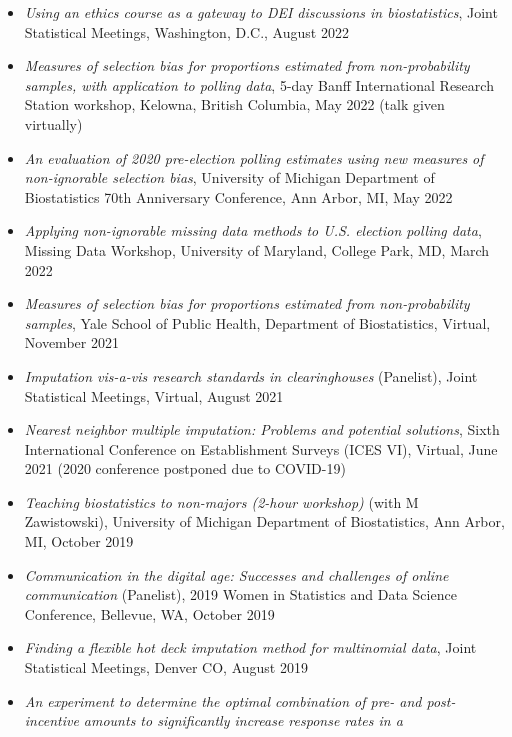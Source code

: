 \documentclass[
  english,
  letterpaper,
  DIV=11,
  numbers=noendperiod]{scrartcl}
\begin{document}
\begin{itemize}
{  non-probability samples and low response rate probability samples},
  Federal Committee on Statistical Methodology 2022 Research and Policy
  Conference, Washington, D.C., October 2022
\item
  \emph{Using an ethics course as a gateway to DEI discussions in
  biostatistics}, Joint Statistical Meetings, Washington, D.C., August
  2022
\item
  \emph{Measures of selection bias for proportions estimated from
  non-probability samples, with application to polling data}, 5-day
  Banff International Research Station workshop, Kelowna, British
  Columbia, May 2022 (talk given virtually)
\item
  \emph{An evaluation of 2020 pre-election polling estimates using new
  measures of non-ignorable selection bias}, University of Michigan
  Department of Biostatistics 70th Anniversary Conference, Ann Arbor,
  MI, May 2022
\item
  \emph{Applying non-ignorable missing data methods to U.S. election
  polling data}, Missing Data Workshop, University of Maryland, College
  Park, MD, March 2022
\item
  \emph{Measures of selection bias for proportions estimated from
  non-probability samples}, Yale School of Public Health, Department of
  Biostatistics, Virtual, November 2021
\item
  \emph{Imputation vis-a-vis research standards in clearinghouses}
  (Panelist), Joint Statistical Meetings, Virtual, August 2021
\item
  \emph{Nearest neighbor multiple imputation: Problems and potential
  solutions}, Sixth International Conference on Establishment Surveys
  (ICES VI), Virtual, June 2021 (2020 conference postponed due to
  COVID-19)
\item
  \emph{Teaching biostatistics to non-majors (2-hour workshop)} (with M
  Zawistowski), University of Michigan Department of Biostatistics, Ann
  Arbor, MI, October 2019
\item
  \emph{Communication in the digital age: Successes and challenges of
  online communication} (Panelist), 2019 Women in Statistics and Data
  Science Conference, Bellevue, WA, October 2019
\item
  \emph{Finding a flexible hot deck imputation method for multinomial
  data}, Joint Statistical Meetings, Denver CO, August 2019
\item
  \emph{An experiment to determine the optimal combination of pre- and
  post-incentive amounts to significantly increase response rates in a
}
\end{itemize}
\end{document}
